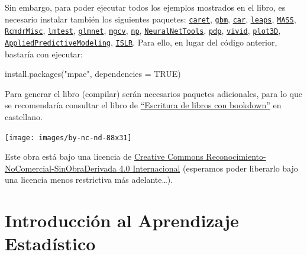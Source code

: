 \documentclass[
]{book}
\newenvironment{Shaded}{\begin{snugshade}}{\end{snugshade}}
\newcommand{\AttributeTok}[1]{\textcolor[rgb]{0.77,0.63,0.00}{#1}}
\newcommand{\ConstantTok}[1]{\textcolor[rgb]{0.00,0.00,0.00}{#1}}
\newcommand{\FunctionTok}[1]{\textcolor[rgb]{0.00,0.00,0.00}{#1}}
\newcommand{\NormalTok}[1]{#1}
\newcommand{\StringTok}[1]{\textcolor[rgb]{0.31,0.60,0.02}{#1}}
\theoremstyle{break}
\theoremstyle{nonumberplain}
\begin{document}
Sin embargo, para poder ejecutar todos los ejemplos mostrados en el libro, es necesario instalar también los siguientes paquetes:
\href{https://CRAN.R-project.org/package=caret}{\texttt{caret}}, \href{https://CRAN.R-project.org/package=gbm}{\texttt{gbm}}, \href{https://CRAN.R-project.org/package=car}{\texttt{car}}, \href{https://CRAN.R-project.org/package=leaps}{\texttt{leaps}}, \href{https://CRAN.R-project.org/package=MASS}{\texttt{MASS}}, \href{https://CRAN.R-project.org/package=RcmdrMisc}{\texttt{RcmdrMisc}}, \href{https://CRAN.R-project.org/package=lmtest}{\texttt{lmtest}}, \href{https://CRAN.R-project.org/package=glmnet}{\texttt{glmnet}}, \href{https://CRAN.R-project.org/package=mgcv}{\texttt{mgcv}}, \href{https://CRAN.R-project.org/package=np}{\texttt{np}}, \href{https://CRAN.R-project.org/package=NeuralNetTools}{\texttt{NeuralNetTools}}, \href{https://CRAN.R-project.org/package=pdp}{\texttt{pdp}}, \href{https://CRAN.R-project.org/package=vivid}{\texttt{vivid}}, \href{https://CRAN.R-project.org/package=plot3D}{\texttt{plot3D}}, \href{https://CRAN.R-project.org/package=AppliedPredictiveModeling}{\texttt{AppliedPredictiveModeling}}, \href{https://CRAN.R-project.org/package=ISLR}{\texttt{ISLR}}.
Para ello, en lugar del código anterior, bastaría con ejecutar:

\begin{Shaded}
\begin{Highlighting}[]
\FunctionTok{install.packages}\NormalTok{(}\StringTok{"mpae"}\NormalTok{, }\AttributeTok{dependencies =} \ConstantTok{TRUE}\NormalTok{)}
\end{Highlighting}
\end{Shaded}

Para generar el libro (compilar) serán necesarios paquetes adicionales,
para lo que se recomendaría consultar el libro de \href{https://rubenfcasal.github.io/bookdown_intro}{``Escritura de libros con bookdown''} en castellano.

\texttt{[image: images/by-nc-nd-88x31]}

Este obra está bajo una licencia de \href{https://creativecommons.org/licenses/by-nc-nd/4.0/deed.es_ES}{Creative Commons Reconocimiento-NoComercial-SinObraDerivada 4.0 Internacional}
(esperamos poder liberarlo bajo una licencia menos restrictiva más adelante\ldots).

\hypertarget{intro-AE}{%
\chapter{Introducción al Aprendizaje Estadístico}\label{intro-AE}}
\end{document}
